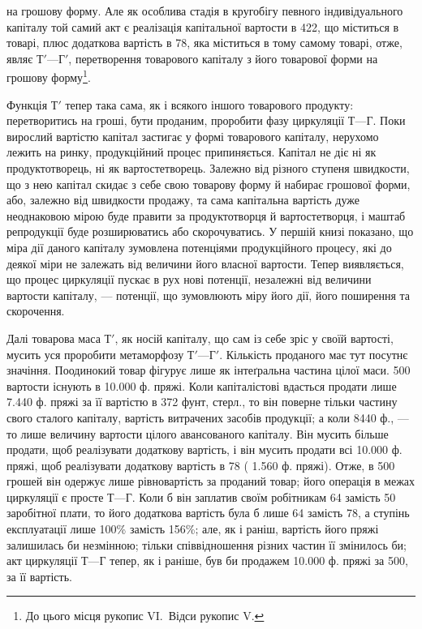 \parcont{}  %
на грошову форму. Але як особлива стадія в кругобігу певного індивідуального
капіталу той самий акт є реалізація капітальної вартости
в 422, що міститься в товарі, плюс додаткова вартість в 78, яка міститься в тому самому товарі, отже, являє $Т' — Г'$, перетворення
товарового капіталу з його товарової форми на грошову форму\footnote{
До цього місця рукопис VI.~Відси рукопис V.
}.

\label{original-16}
Функція $Т'$ тепер така сама, як і всякого іншого товарового продукту:
перетворитись на гроші, бути проданим, проробити фазу циркуляції
$Т — Г$. Поки вирослий вартістю капітал застигає у формі товарового
капіталу, нерухомо лежить на ринку, продукційний процес припиняється.
Капітал не діє ні як продуктотворець, ні як вартостетворець. Залежно від
різного ступеня швидкости, що з нею капітал скидає з себе свою товарову
форму й набирає грошової форми, або, залежно від швидкости продажу,
та сама капітальна вартість дуже неоднаковою мірою буде правити за
продуктотворця й вартостетворця, і маштаб репродукції буде розширюватись
або скорочуватись. У першій книзі показано, що міра дії даного
капіталу зумовлена потенціями продукційного процесу, які до деякої
міри не залежать від величини його власної вартости. Тепер виявляється,
що процес циркуляції пускає в рух нові потенції, незалежні від величини
вартости капіталу, — потенції, що зумовлюють міру його дії, його поширення
та скорочення.

Далі товарова маса $Т'$, як носій капіталу, що сам із себе зріс у своїй
вартості, мусить уся проробити метаморфозу $Т' — Г'$. Кількість проданого
має тут посутнє значіння. Поодинокий товар фігурує лише як інтеґральна
частина цілої маси. 500 вартости існують в \num{10.000} ф. пряжі.
Коли капіталістові вдасться продати лише \num{7.440} ф. пряжі за її вартістю
в 372 фунт, стерл., то він поверне тільки частину свого сталого капіталу,
вартість витрачених засобів продукції; а коли 8440 ф., — то лише величину
вартости цілого авансованого капіталу. Він мусить більше продати, щоб
реалізувати додаткову вартість, і він мусить продати всі \num{10.000} ф.
пряжі, щоб реалізувати додаткову вартість в 78 (\deq{} \num{1.560} ф.
пряжі). Отже, в 500 грошей він одержує лише рівновартість
за проданий товар; його операція в межах циркуляції є просте $Т — Г$.
Коли б він заплатив своїм робітникам 64 замість 50
заробітної плати, то його додаткова вартість була б лише 64
замість 78, а ступінь експлуатації лише 100\% замість
156\%; але, як і раніш, вартість його пряжі залишилась би незмінною;
тільки співвідношення різних частин її змінилось би; акт циркуляції $Т — Г$
тепер, як і раніше, був би продажем \num{10.000} ф. пряжі за 500,
за її вартість.

